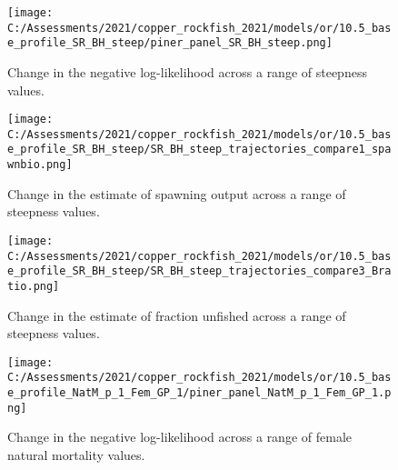 \documentclass[11pt,
  english,
  a4paper,
]{article}
\begin{document}
\tagmcend\tagstructend


\begin{figure}
\centering
\texttt{[image: C:/Assessments/2021/copper\_rockfish\_2021/models/or/10.5\_base\_profile\_SR\_BH\_steep/piner\_panel\_SR\_BH\_steep.png]}
\caption{Change in the negative log-likelihood across a range of steepness values.\label{fig:h-profile}}
\end{figure}

\tagmcend\tagstructend


\begin{figure}
\centering
\texttt{[image: C:/Assessments/2021/copper\_rockfish\_2021/models/or/10.5\_base\_profile\_SR\_BH\_steep/SR\_BH\_steep\_trajectories\_compare1\_spawnbio.png]}
\caption{Change in the estimate of spawning output across a range of steepness values.\label{fig:h-ssb}}
\end{figure}

\tagmcend\tagstructend


\begin{figure}
\centering
\texttt{[image: C:/Assessments/2021/copper\_rockfish\_2021/models/or/10.5\_base\_profile\_SR\_BH\_steep/SR\_BH\_steep\_trajectories\_compare3\_Bratio.png]}
\caption{Change in the estimate of fraction unfished across a range of steepness values.\label{fig:h-depl}}
\end{figure}

\tagmcend\tagstructend


\begin{figure}
\centering
\texttt{[image: C:/Assessments/2021/copper\_rockfish\_2021/models/or/10.5\_base\_profile\_NatM\_p\_1\_Fem\_GP\_1/piner\_panel\_NatM\_p\_1\_Fem\_GP\_1.png]}
\caption{Change in the negative log-likelihood across a range of female natural mortality values.\label{fig:m-profile}}
\end{figure}
\end{document}
